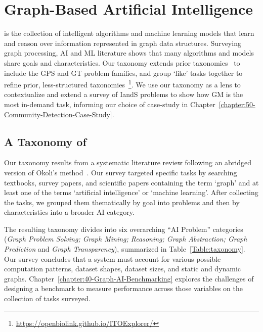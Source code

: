 \section{Graph-Based Artificial Intelligence}
\label{section:20-graph-based-ai}

\gai is the collection of intelligent algorithms and machine learning models that learn and reason over information represented in graph data structures.
Surveying graph processing, \ac{AI} and \ac{ML} literature shows that many algorithms and models share goals and characteristics. 
Our \gai taxonomy extends prior \gai taxonomies~\cite{Chen2020a, Smith2021, Zhou2020a, Xia2021} to include the \ac{GPS} and \ac{GT} problem families, and group `like' tasks together to refine prior, less-structured taxonomies~\cite{Blagec2022}\footnote{\scriptsize \url{https://openbiolink.github.io/ITOExplorer/}}.
We use our \gai taxonomy as a lens to contextualize and extend a survey of \ac{IandS} problems to show how \ac{GM} is the most in-demand \gai task, informing our choice of case-study in Chapter~\ref{chapter:50-Community-Detection-Case-Study}.

\subsection{A Taxonomy of \gai}
Our \gai taxonomy results from a systematic literature review following an abridged version of Okoli's method~\cite{Okoli2015}. 
Our survey targeted specific \gai tasks by searching textbooks, survey papers, and scientific papers containing the term `graph' and at least one of the terms `artificial intelligence' or `machine learning'. 
\noindent After collecting the tasks, we grouped them thematically by goal into \gai problems and then by characteristics into a broader \ac{AI} category. 

The resulting taxonomy divides \gai into six overarching ``AI Problem'' categories (\textit{Graph Problem Solving; Graph Mining; Reasoning; Graph Abstraction; Graph Prediction} and \textit{Graph Transparency}), summarized in Table~\ref{Table:taxonomy}. 
Our survey concludes that a \gai system must account for various possible computation patterns, dataset shapes, dataset sizes, and static and dynamic graphs. 
Chapter~\ref{chapter:40-Graph-AI-Benchmarking} explores the challenges of designing a benchmark to measure performance across those variables on the collection of \gai tasks surveyed.

